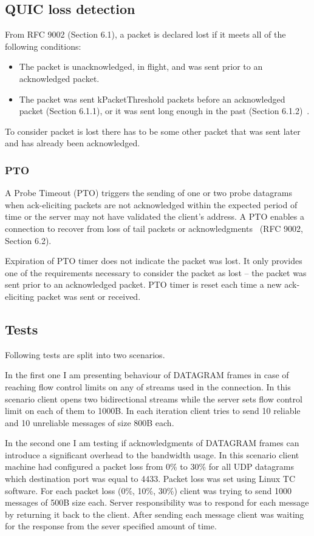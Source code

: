 \subsection{QUIC loss detection}
\label{subsec:loss-detection}
From RFC 9002 (Section 6.1), a packet is declared lost if it meets all of the following conditions:
\begin{itemize}
    \item The packet is unacknowledged, in flight, and was sent prior to an acknowledged packet.
    \item The packet was sent kPacketThreshold packets before an acknowledged packet (Section 6.1.1), or it was sent long enough in the past (Section 6.1.2)~\cite{rfc9002}.
\end{itemize}

To consider packet is lost there has to be some other packet that was sent later and has already been acknowledged.

\subsubsection{PTO}
A Probe Timeout (PTO) triggers the sending of one or two probe datagrams when ack-eliciting packets are not acknowledged within the expected period of time or the server may not have validated the client's address.
A PTO enables a connection to recover from loss of tail packets or acknowledgments~\cite{rfc9002} (RFC 9002, Section 6.2).

Expiration of PTO timer does not indicate the packet was lost.
It only provides one of the requirements necessary to consider the packet as lost -- the packet was sent prior to an acknowledged packet.
PTO timer is reset each time a new ack-eliciting packet was sent or received.

\subsection{Tests}
\label{subsec:tests2}
Following tests are split into two scenarios.

In the first one I am presenting behaviour of DATAGRAM frames in case of reaching flow control limits on any of streams used in the connection.
In this scenario client opens two bidirectional streams while the server sets flow control limit on each of them to 1000B\@.
In each iteration client tries to send 10 reliable and 10 unreliable messages of size 800B each.

In the second one I am testing if acknowledgments of DATAGRAM frames can introduce a significant overhead to the bandwidth usage.
In this scenario client machine had configured a packet loss from 0\% to 30\% for all UDP datagrams which destination port was equal to 4433.
Packet loss was set using Linux TC software.
For each packet loss (0\%, 10\%, 30\%) client was trying to send 1000 messages of 500B size each.
Server responsibility was to respond for each message by returning it back to the client.
After sending each message client was waiting for the response from the sever specified amount of time.

